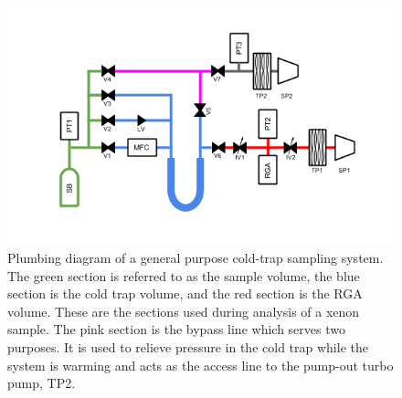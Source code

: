 \begin{figure}[h]
  \includegraphics[width=\linewidth]{Figures/ColdTrap_diagram.png}
  \caption{Plumbing diagram of a general purpose cold-trap sampling system. The green section is referred to as the sample volume, the blue section is the cold trap volume, and the red section is the RGA volume. These are the sections used during analysis of a xenon sample. The pink section is the bypass line which serves two purposes. It is used to relieve pressure in the cold trap while the system is warming and acts as the access line to the pump-out turbo pump, TP2. }
  \label{fig:CTpid}
\end{figure}

